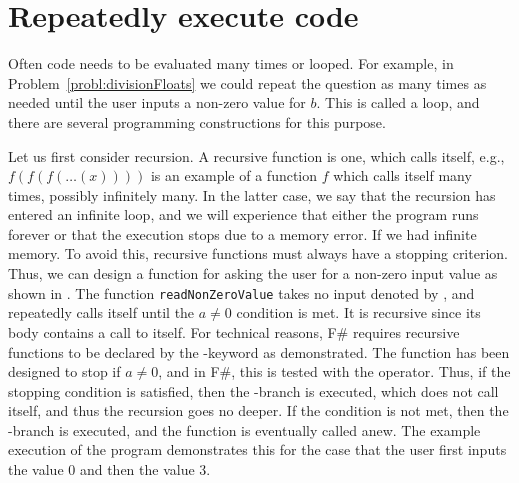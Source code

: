 \documentclass[fsharpNotes.tex]{subfiles}
\begin{document}
\section{Repeatedly execute code}
Often code needs to be evaluated many times or looped. For example, in Problem~\ref{probl:divisionFloats} we could repeat the question as many times as needed until the user inputs a non-zero value for $b$. This is called a loop, and there are several programming constructions for this purpose.

Let us first consider recursion. A recursive function is one, which calls itself, e.g., $f(f(f(\dots(x))))$ is an example of a function $f$ which calls itself many times, possibly infinitely many. In the latter case, we say that the recursion has entered an infinite loop, and we will experience that either the program runs forever or that the execution stops due to a memory error. If we had infinite memory. To avoid this, recursive functions must always have a stopping criterion. Thus, we can design a function for asking the user for a non-zero input value as shown in .
% 
%
The function \lstinline{readNonZeroValue} takes no input denoted by \lexeme{()}, and repeatedly calls itself until the $a\neq 0$ condition is met. It is recursive since its body contains a call to itself. For technical reasons, F\# requires recursive functions to be declared by the -keyword as demonstrated. The function has been designed to stop if $a\neq 0$, and in F\#, this is tested with the \lexeme{<>} operator. Thus, if the stopping condition is satisfied, then the -branch is executed, which does not call itself, and thus the recursion goes no deeper. If the condition is not met, then the -branch is executed, and the function is eventually called anew. The example execution of the program demonstrates this for the case that the user first inputs the value 0 and then the value 3.
\end{document}

